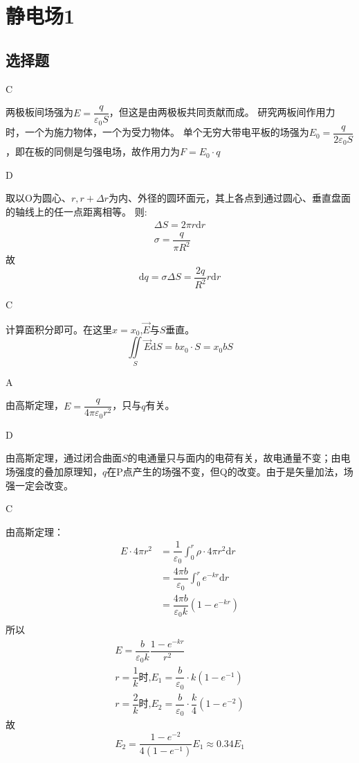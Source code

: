 \documentclass[b5paper,opensource]{./template/qyxf-book}
\newcommand{\di}[1]{\mathrm{d}#1}
\begin{document}
\chapter{静电场1}
\section{选择题}

C

\solve
两极板间场强为$E=\dfrac{q}{\varepsilon_0S}$，但这是由两极板共同贡献而成。
研究两板间作用力时，一个为施力物体，一个为受力物体。
单个无穷大带电平板的场强为$E_0=\dfrac{q}{2\varepsilon_0S}$，即在板的同侧是匀强电场，故作用力为$F=E_0\cdot q$

D

\solve
取以O为圆心、$r,r+\Delta r$为内、外径的圆环面元，其上各点到通过圆心、垂直盘面的轴线上的任一点距离相等。
则:
\begin{gather*}
	\Delta S=2\pi r\di{r}\\
	\sigma=\dfrac{q}{\pi R^2}
\end{gather*}
故
\begin{equation*}
	\di{q}=\sigma \Delta S=\dfrac{2q}{R^2}r\di{r}
\end{equation*}

C

\solve
计算面积分即可。在这里$x=x_0$,$\vec{E}$与$S$垂直。
\begin{equation*}
	 \iint\limits_S \vec{E}\di{S}=bx_0\cdot S=x_0bS
\end{equation*}

A

\solve
由高斯定理，$E=\dfrac{q}{4\pi\varepsilon_0 r^2}$，只与$q$有关。

D

\solve
由高斯定理，通过闭合曲面$S$的电通量只与面内的电荷有关，故电通量不变；由电场强度的叠加原理知，$q$在P点产生的场强不变，但Q的改变。由于是矢量加法，场强一定会改变。

C

\solve
由高斯定理：
\begin{align*}
	E\cdot 4\pi r^2&=\dfrac{1}{\varepsilon_0}\int_0^r\rho\cdot 4\pi r^2\di{r}\\
	&=\dfrac{4\pi b}{\varepsilon_0}\int_0^r e^{-kr}\di{r}\\
	&=\dfrac{4\pi b}{\varepsilon_0 k}(1-e^{-kr})\\
\end{align*}
所以
\begin{gather*}
	E=\dfrac{b}{\varepsilon_0 k}\dfrac{1-e^{-kr}}{r^2}\\
	r=\dfrac{1}{k}\text{时,}E_1=\dfrac{b}{\varepsilon_0}\cdot k(1-e^{-1})\\
	r=\dfrac{2}{k}\text{时,}E_2=\dfrac{b}{\varepsilon_0}\cdot \dfrac{k}{4}(1-e^{-2})
\end{gather*}
故
\begin{equation*}
	E_2=\dfrac{1-e^{-2}}{4(1-e^{-1})}E_1\approx 0.34E_1
\end{equation*}
\end{document}
